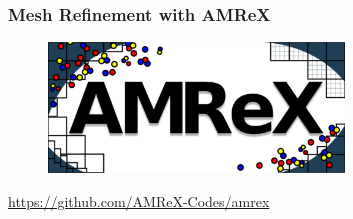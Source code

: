 \documentclass{beamer}
\begin{document}
\begin{frame}
\frametitle{Mesh Refinement with AMReX}

  \begin{figure}[htb!]
    \centering
    \includegraphics[width=0.7\textwidth]{amrex.png}
  \end{figure}

  \begin{center}
    \url{https://github.com/AMReX-Codes/amrex}
  \end{center}

\end{frame}
\end{document}
